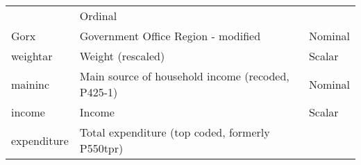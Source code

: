 \documentclass[]{article}
\begin{document}
\begin{longtable}[]{@{}lll@{}}
\begin{minipage}[t]{0.64\columnwidth}
\end{minipage} & \begin{minipage}[t]{0.14\columnwidth}\raggedright
Ordinal\strut
\end{minipage}\tabularnewline
\begin{minipage}[t]{0.14\columnwidth}\raggedright
Gorx\strut
\end{minipage} & \begin{minipage}[t]{0.64\columnwidth}\raggedright
Government Office Region - modified\strut
\end{minipage} & \begin{minipage}[t]{0.14\columnwidth}\raggedright
Nominal\strut
\end{minipage}\tabularnewline
\begin{minipage}[t]{0.14\columnwidth}\raggedright
weightar\strut
\end{minipage} & \begin{minipage}[t]{0.64\columnwidth}\raggedright
Weight (rescaled)\strut
\end{minipage} & \begin{minipage}[t]{0.14\columnwidth}\raggedright
Scalar\strut
\end{minipage}\tabularnewline
\begin{minipage}[t]{0.14\columnwidth}\raggedright
maininc\strut
\end{minipage} & \begin{minipage}[t]{0.64\columnwidth}\raggedright
Main source of household income (recoded, P425-1)\strut
\end{minipage} & \begin{minipage}[t]{0.14\columnwidth}\raggedright
Nominal\strut
\end{minipage}\tabularnewline
\begin{minipage}[t]{0.14\columnwidth}\raggedright
income\strut
\end{minipage} & \begin{minipage}[t]{0.64\columnwidth}\raggedright
Income\strut
\end{minipage} & \begin{minipage}[t]{0.14\columnwidth}\raggedright
Scalar\strut
\end{minipage}\tabularnewline
\begin{minipage}[t]{0.14\columnwidth}\raggedright
expenditure\strut
\end{minipage} & \begin{minipage}[t]{0.64\columnwidth}\raggedright
Total expenditure (top coded, formerly P550tpr)\strut
\end{minipage} & \begin{minipage}[t]{0.14\columnwidth}\raggedright

\end{minipage}
\end{longtable}
\end{document}
